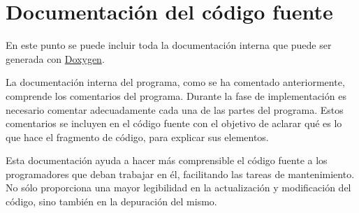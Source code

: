 

\section{Documentación del código fuente}

En este punto se puede incluir toda la documentación interna que puede ser generada con \href{https://www.doxygen.nl/index.html}{Doxygen}.

La documentación interna del programa, como se ha comentado anteriormente, comprende los comentarios del programa. Durante la fase de implementación es necesario comentar adecuadamente cada una de las partes del programa. Estos comentarios se incluyen en el código fuente con el objetivo de aclarar qué es lo que hace el fragmento de código, para explicar sus elementos. 

Esta documentación ayuda a hacer más comprensible el código fuente a los programadores que deban trabajar en él, facilitando las tareas de mantenimiento. No sólo proporciona una mayor legibilidad en la actualización y modificación del código, sino también en la depuración del mismo.
